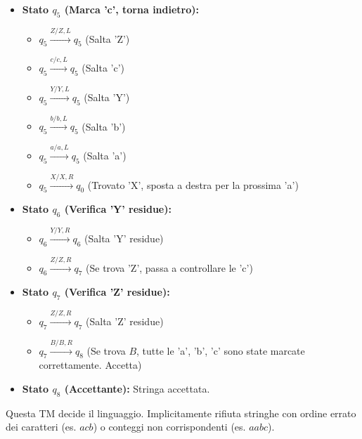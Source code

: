 \documentclass[a4paper]{article}
\begin{document}
\begin{itemize}
\begin{itemize}
        \end{itemize}
    \item \textbf{Stato $q_5$ (Marca 'c', torna indietro):}
        \begin{itemize}
            \item $q_5 \xrightarrow{Z / Z, L} q_5$ (Salta 'Z')
            \item $q_5 \xrightarrow{c / c, L} q_5$ (Salta 'c')
            \item $q_5 \xrightarrow{Y / Y, L} q_5$ (Salta 'Y')
            \item $q_5 \xrightarrow{b / b, L} q_5$ (Salta 'b')
            \item $q_5 \xrightarrow{a / a, L} q_5$ (Salta 'a')
            \item $q_5 \xrightarrow{X / X, R} q_0$ (Trovato 'X', sposta a destra per la prossima 'a')
        \end{itemize}
    \item \textbf{Stato $q_6$ (Verifica 'Y' residue):}
        \begin{itemize}
            \item $q_6 \xrightarrow{Y / Y, R} q_6$ (Salta 'Y' residue)
            \item $q_6 \xrightarrow{Z / Z, R} q_7$ (Se trova 'Z', passa a controllare le 'c')
        \end{itemize}
    \item \textbf{Stato $q_7$ (Verifica 'Z' residue):}
        \begin{itemize}
            \item $q_7 \xrightarrow{Z / Z, R} q_7$ (Salta 'Z' residue)
            \item $q_7 \xrightarrow{B / B, R} q_8$ (Se trova $B$, tutte le 'a', 'b', 'c' sono state marcate correttamente. Accetta)
        \end{itemize}
    \item \textbf{Stato $q_8$ (Accettante):} Stringa accettata.
\end{itemize}
Questa TM decide il linguaggio. Implicitamente rifiuta stringhe con ordine errato dei caratteri (es. $acb$) o conteggi non corrispondenti (es. $aabc$).
\end{document}
